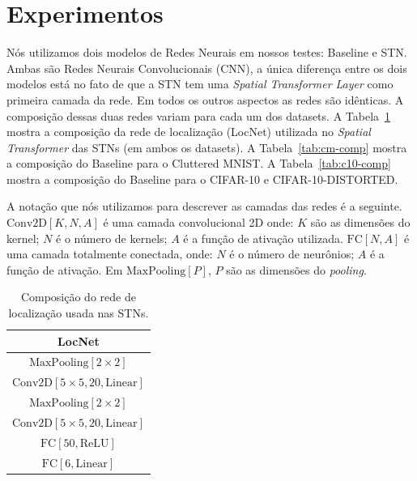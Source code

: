 \documentclass[conference]{IEEEtran}
\begin{document}
\section{Experimentos}

Nós utilizamos dois modelos de Redes Neurais em nossos testes: Baseline e STN. Ambas são Redes Neurais Convolucionais (CNN), a única diferença entre os dois modelos está no fato de que a STN tem uma \textit{Spatial Transformer Layer} como primeira camada da rede. Em todos os outros aspectos as redes são idênticas. A composição dessas duas redes variam para cada um dos datasets. A Tabela~\ref{tab:locnet-comp} mostra a composição da rede de localização (LocNet) utilizada no \textit{Spatial Transformer} das STNs (em ambos os datasets). A Tabela~\ref{tab:cm-comp} mostra a composição do Baseline para o Cluttered MNIST. A Tabela~\ref{tab:c10-comp} mostra a composição do Baseline para o CIFAR-10 e CIFAR-10-DISTORTED.

A notação que nós utilizamos para descrever as camadas das redes é a seguinte.
$\text{Conv2D}[K, N, A]$ é uma camada convolucional 2D onde: $K$ são as dimensões do kernel; $N$ é o número de kernels; $A$ é a função de ativação utilizada.
$\text{FC}[N, A]$ é uma camada totalmente conectada, onde: $N$ é o número de neurônios; $A$ é a função de ativação.
Em $\text{MaxPooling}[P]$, $P$ são as dimensões do \textit{pooling}.

\begin{table}[!ht]
  \begin{center}
    \begin{tabular}{|c|}
      \hline
      \textbf{LocNet}                              \\ \hline
      $\text{MaxPooling}[2\times2]$                \\ \hline
      $\text{Conv2D}[5\times5, 20, \text{Linear}]$ \\ \hline
      $\text{MaxPooling}[2\times2]$                \\ \hline
      $\text{Conv2D}[5\times5, 20, \text{Linear}]$ \\ \hline
      $\text{FC}[50, \text{ReLU}]$                 \\ \hline
      $\text{FC}[6, \text{Linear}]$                \\ \hline
    \end{tabular}
  \end{center}
  \caption{Composição do rede de localização usada nas STNs.}
  \label{tab:locnet-comp}
\end{table}
\end{document}
